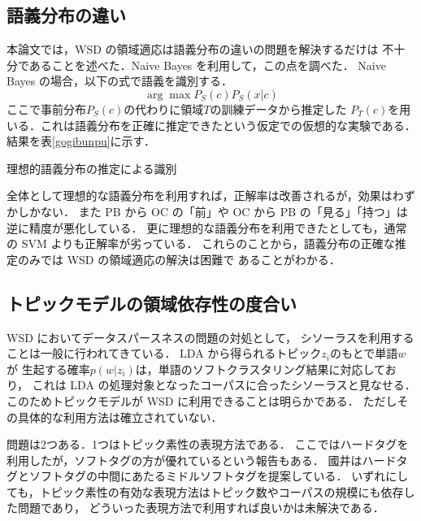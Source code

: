 \documentclass[japanese]{jnlp_1.4}
\begin{document}
\subsection{語義分布の違い}

本論文では，WSD の領域適応は語義分布の違いの問題を解決するだけは
不十分であることを述べた．Naive Bayes を利用して，この点を調べた．
Naive Bayes の場合，以下の式で語義を識別する．
\[
\arg \max P_S(c) P_S(x|c)
\]
ここで事前分布\( P_S (c) \)の代わりに領域\( T \)の訓練データから推定した
\( P_T (c) \)を用いる．これは語義分布を正確に推定できたという仮定での仮想的な実験である．
結果を\mbox{表\ref{gogibunpu}}に示す．

\begin{table}[b]
\caption{理想的語義分布の推定による識別}
\label{gogibunpu}

\end{table}

全体として理想的な語義分布を利用すれば，正解率は改善されるが，効果はわずかしかない．
また PB から OC の「前」や OC から PB の「見る」「持つ」は逆に精度が悪化している．
更に理想的な語義分布を利用できたとしても，通常の SVM よりも正解率が劣っている．
これらのことから，語義分布の正確な推定のみでは WSD の領域適応の解決は困難で
あることがわかる．


\subsection{トピックモデルの領域依存性の度合い}

WSD においてデータスパースネスの問題の対処として，
シソーラスを利用することは一般に行われてきている．
LDA から得られるトピック\( z_i \)のもとで単語\( w \)が
生起する確率\( p(w|z_i) \)は，単語のソフトクラスタリング結果に対応しており，
これは LDA の処理対象となったコーパスに合ったシソーラスと見なせる．
このためトピックモデルが WSD に利用できることは明らかである．
ただしその具体的な利用方法は確立されていない．

問題は2つある．1つはトピック素性の表現方法である．
ここではハードタグを利用したが，ソフトタグの方が優れているという報告もある\cite{cai}．
國井はハードタグとソフトタグの中間にあたるミドルソフトタグを提案している\cite{kunii}．
いずれにしても，トピック素性の有効な表現方法はトピック数やコーパスの規模にも依存した問題であり，
どういった表現方法で利用すれば良いかは未解決である．
\end{document}
